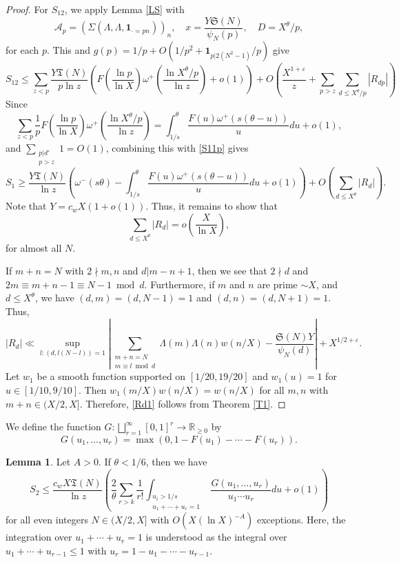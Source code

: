 \documentclass{amsart}
\theoremstyle{definition}
\newtheorem{lem}[dfn]{Lemma}
\theoremstyle{remark}
\newcommand{\1}{
    \bm{1}
}
\begin{document}
\begin{proof}
For $S_{12}$, we apply Lemma \ref{LS} with
\[ \mathcal{A}_p = (\Sigma(\Lambda,\Lambda,\1_{\cdot=pn}))_n, \quad x = \frac{Y \mathfrak{S}(N)}{\psi_N(p)}, \quad D=X^{\theta}/p, \]
for each $p$. 
This and $g(p) = 1/p + O(1/p^2 + \1_{p|2(N^2-1)}/p)$ give
\[ S_{12} \leq \sum_{z<p} \frac{Y \mathfrak{T}(N)}{p\ln{z}} \left( F\left(\frac{\ln{p}}{\ln{X}}\right) \omega^{+}\left(\frac{\ln{X^{\theta}/p}}{\ln{z}}\right) +o(1) \right) + O\left( \frac{X^{1+\varepsilon}}{z} + \sum_{p>z} \sum_{d \leq X^{\theta}/p} \left| R_{dp} \right| \right) \]
Since
\[ \sum_{z<p} \frac{1}{p} F\left(\frac{\ln{p}}{\ln{X}}\right) \omega^{+}\left(\frac{\ln{X^{\theta}/p}}{\ln{z}}\right) = \int_{1/s}^{\theta} \frac{F(u) \omega^{+}(s(\theta-u))}{u} du + o(1), \]
and $\sum_{\substack{p|d' \\ p>z}} 1 = O(1)$, combining this with \eqref{S11p} gives
\[ S_1 \geq \frac{Y \mathfrak{T}(N)}{\ln{z}} \left(\omega^{-}(s\theta) - \int_{1/s}^{\theta} \frac{F(u) \omega^{+}(s(\theta-u))}{u} du +o(1) \right) + O\left( \sum_{d \leq X^{\theta}} \left| R_{d} \right| \right). \]
Note that $Y = c_{w}X(1+o(1))$. Thus, it remains to show that
\begin{equation} \sum_{d \leq X^{\theta}} \left| R_{d} \right| = o\left( \frac{X}{\ln{X}} \right), \label{Rd1} \end{equation}
for almost all $N$. 


If $m+n=N$ with $2 \nmid m,n$ and $d|m-n+1$, then we see that $2\nmid d$ and $2m \equiv m+n-1 \equiv N-1 \bmod d$. Furthermore, if $m$ and $n$ are prime $\sim X$, and $d \leq X^{\theta}$, we have $(d,m)=(d,N-1)=1$ and $(d,n)=(d,N+1)=1$. 
Thus,
\[ |R_d| \ll\sup_{l:(d,l(N-l))=1} \left| \sum_{\substack{m+n=N \\ m \equiv l \bmod d}} \Lambda(m) \Lambda(n) w(n/X) - \frac{\mathfrak{S}(N) Y}{\psi_N(d)} \right| + X^{1/2+\varepsilon}. \]
Let $w_1$ be a smooth function supported on $[1/20,19/20]$ and $w_1(u)=1$ for $u \in [1/10,9/10]$. Then $w_1(m/X) w(n/X) = w(n/X)$ for all $m,n$ with $m+n \in (X/2,X]$. 
Therefore, \eqref{Rd1} follows from Theorem \ref{T1}. 


\end{proof}






We define the function $G:\bigsqcup_{r=1}^{\infty} [0,1]^r \to \mathbb{R}_{\geq 0}$ by
\[ G(u_1,\ldots,u_r) = \max(0,1-F(u_1)-\cdots-F(u_r)). \]


\begin{lem}\label{t1S2}
Let $A>0$. If $\theta < 1/6$, then we have
\[ S_2 \leq \frac{c_w X \mathfrak{T}(N)}{\ln{z}} \left( \frac{2}{\theta} \sum_{r>k} \frac{1}{r!} \int_{\substack{u_i>1/s \\ u_1+\cdots+u_r=1}} \frac{G(u_1,\ldots,u_r)}{u_1 \cdots u_r} du +o(1) \right) \]
for all even integers $N \in (X/2,X]$ with $O(X(\ln{X})^{-A})$ exceptions. 
Here, the integration over $u_1+\cdots+u_r=1$ is understood as the integral over $u_1 + \cdots + u_{r-1} \leq 1$ with $u_r=1-u_1-\cdots-u_{r-1}$. 
\end{lem}
\end{document}
